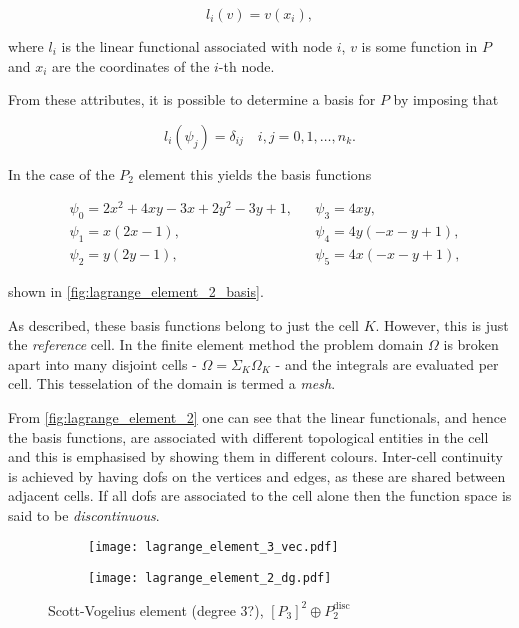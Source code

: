 \documentclass[thesis]{subfiles}
\begin{document}
\begin{equation*}
  l_i(v) = v(x_i),
\end{equation*}

where $l_i$ is the linear functional associated with node $i$, $v$ is some function in $P$ and $x_i$ are the coordinates of the $i$-th node.

From these attributes, it is possible to determine a basis for $P$ by imposing that

\begin{equation*}
  l_i(\psi_j) = \delta_{ij} \quad i, j = 0, 1, \dots, n_k.
\end{equation*}

In the case of the $P_2$ element this yields the basis functions

\begin{align*}
  &\psi_0 = 2x^2 + 4xy - 3x + 2y^2-3y+1,
  &
  &\psi_3 = 4xy, \\
  &\psi_1 = x(2x-1),
  &
  &\psi_4 = 4y(-x-y+1), \\
  &\psi_2 = y(2y-1),
  &
  &\psi_5 = 4x(-x-y+1),
\end{align*}

shown in \cref{fig:lagrange_element_2_basis}.

As described, these basis functions belong to just the cell $K$.
However, this is just the \textit{reference} cell.
In the finite element method the problem domain $\Omega$ is broken apart into many disjoint cells - $\Omega = \Sigma_K \Omega_K$ - and the integrals are evaluated per cell.
This tesselation of the domain is termed a \textit{mesh}.

From \cref{fig:lagrange_element_2} one can see that the linear functionals, and hence the basis functions, are associated with different topological entities in the cell and this is emphasised by showing them in different colours.
Inter-cell continuity is achieved by having \glspl{dof} on the vertices and edges, as these are shared between adjacent cells.
If all \glspl{dof} are associated to the cell alone then the function space is said to be \textit{discontinuous}.

\begin{figure}
  \centering
  \hfill
  \begin{subfigure}{.4\textwidth}
    \texttt{[image: lagrange\_element\_3\_vec.pdf]}
    \label{fig:scott_vogelius_element_P3}
  \end{subfigure}
  \hfill
  \begin{subfigure}{.4\textwidth}
    \texttt{[image: lagrange\_element\_2\_dg.pdf]}
  \end{subfigure}
  \hfill
  \caption{Scott-Vogelius element (degree 3?), $[P_3]^2 \oplus P_2^\mathrm{disc}$}
  \label{fig:scott_vogelius_element}
\end{figure}
\end{document}
